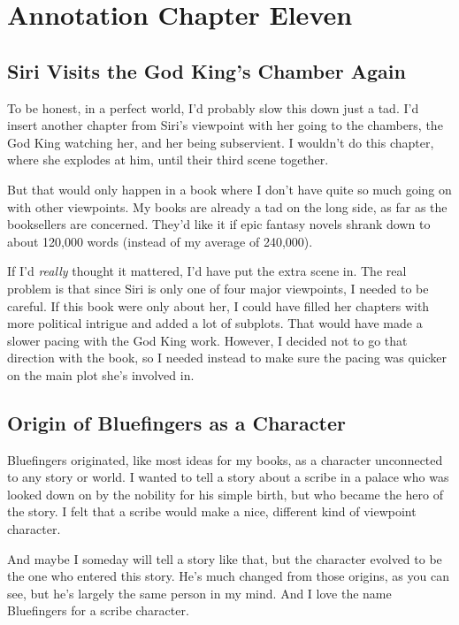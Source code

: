 \section{Annotation Chapter Eleven}

\subsection*{Siri Visits the God King’s Chamber Again}

To be honest, in a perfect world, I’d probably slow this down just a tad. I’d insert another chapter from Siri’s viewpoint with her going to the chambers, the God King watching her, and her being subservient. I wouldn’t do this chapter, where she explodes at him, until their third scene together.

But that would only happen in a book where I don’t have quite so much going on with other viewpoints. My books are already a tad on the long side, as far as the booksellers are concerned. They’d like it if epic fantasy novels shrank down to about 120,000 words (instead of my average of 240,000).

If I’d \textit{really} thought it mattered, I’d have put the extra scene in. The real problem is that since Siri is only one of four major viewpoints, I needed to be careful. If this book were only about her, I could have filled her chapters with more political intrigue and added a lot of subplots. That would have made a slower pacing with the God King work. However, I decided not to go that direction with the book, so I needed instead to make sure the pacing was quicker on the main plot she’s involved in.

\subsection*{Origin of Bluefingers as a Character}

Bluefingers originated, like most ideas for my books, as a character unconnected to any story or world. I wanted to tell a story about a scribe in a palace who was looked down on by the nobility for his simple birth, but who became the hero of the story. I felt that a scribe would make a nice, different kind of viewpoint character.

And maybe I someday will tell a story like that, but the character evolved to be the one who entered this story. He’s much changed from those origins, as you can see, but he’s largely the same person in my mind. And I love the name Bluefingers for a scribe character.



